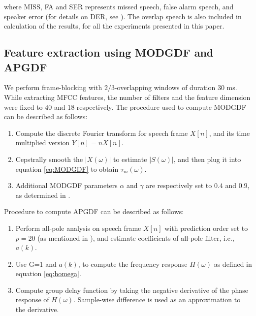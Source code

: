 \documentclass[conference]{IEEEtran}
\begin{document}
where MISS, FA and SER represents  missed speech, false alarm speech, and speaker error (for details on DER, see \cite{NIST}). The overlap speech is also included in calculation of the results, for all the experiments presented in this paper. 

\subsection{Feature extraction using MODGDF and APGDF}

We perform frame-blocking with $2/3$-overlapping windows of duration 30 ms. 
While extracting MFCC features, the
number of filters and the feature dimension were fixed to $40$ and $18$
respectively. The procedure used to compute MODGDF can be described as follows:

\begin{enumerate}
\item Compute the discrete Fourier transform for speech frame $X[n]$, and its time
multiplied version $Y[n]=nX[n]$.
\item Cepstrally smooth the $|X(\omega)|$ to estimate $|S(\omega)|$,
and then plug it into equation \ref{eq:MODGDF} to obtain $\tau_{m}(\omega)$.
\item Additional MODGDF parameters $\alpha$ and $\gamma$ are respectively set to $0.4$ and $0.9$,
as determined in \cite{modifiedGD}.
\end{enumerate}	

\vspace{0.2cm}
Procedure to compute APGDF can be described as follows:
\begin{enumerate}
\item Perform all-pole analysis on speech frame $X[n]$ with prediction order set to
$p=20$ (as mentioned in \cite{allPoleGdSid}), and estimate coefficients of all-pole filter, i.e., $a(k)$.   
\item Use G=1 and $a(k)$, to compute the frequency response $H(\omega)$ as defined
in equation \ref{eq:homega}.
\item Compute group delay function by taking the negative derivative of
the phase response of $H(\omega)$. Sample-wise
difference is used as an approximation to the derivative.
\end{enumerate}	
\vspace{0.2cm}
\end{document}
